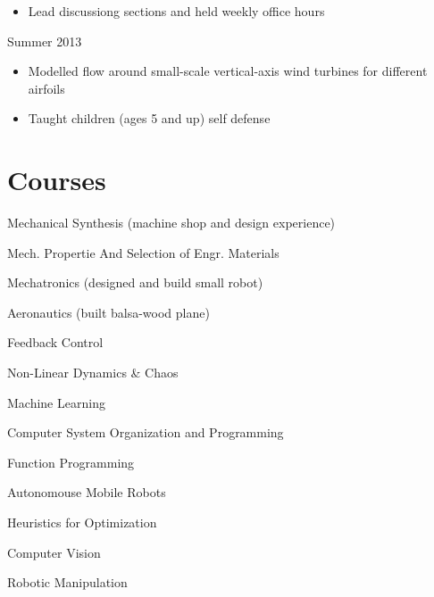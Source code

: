 \documentclass{BradyResume}
\begin{document}
\begin{itemize}
  \item Lead discussiong sections and held weekly office hours
\end{itemize}

%
           {Summer 2013}
\begin{itemize}
  \item Modelled flow around small-scale vertical-axis wind turbines for different airfoils
\end{itemize}

\begin{itemize}
  \item Taught children (ages 5 and up) self defense
\end{itemize}

\section*{Courses}
\begin{pipelist}[Mechanical]
    \item Mechanical Synthesis (machine shop and design experience) 
    \item Mech. Propertie And Selection of Engr. Materials 
    \item Mechatronics (designed and build small robot) 
    \item Aeronautics (built balsa-wood plane) 
    \item Feedback Control 
    \item Non-Linear Dynamics \& Chaos 
\end{pipelist}

\begin{pipelist}
    \item Machine Learning 
    \item Computer System Organization and Programming 
    \item Function Programming 
    \item Autonomouse Mobile Robots 
    \item Heuristics for Optimization 
    \item Computer Vision 
    \item Robotic Manipulation
\end{pipelist}
\end{document}
